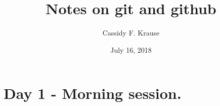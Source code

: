 \documentclass[12pt]{article}
\title{Notes on git and github}
\author{Cassidy F. Krause}
\date{July 16, 2018}
\begin{document}
\maketitle

\section{Day 1 - Morning session.}
\end{document}
